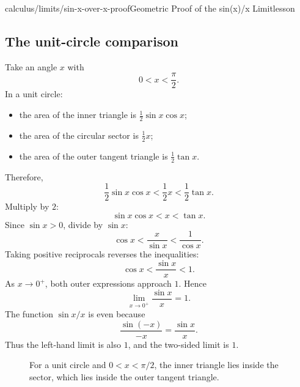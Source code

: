 \documentclass[11pt,openany]{book}
\theoremstyle{bgplain}
\begin{document}
\begin{webpage}{calculus/limits/sin-x-over-x-proof}{Geometric Proof of the sin(x)/x Limit}{lesson}
\subsection{The unit-circle comparison}

Take an angle \(x\) with
\[
  0<x<\frac{\pi}{2}.
\]
In a unit circle:

\begin{itemize}
  \item the area of the inner triangle is \(\frac12\sin x\cos x\);
  \item the area of the circular sector is \(\frac12x\);
  \item the area of the outer tangent triangle is \(\frac12\tan x\).
\end{itemize}

Therefore,
\[
  \frac12\sin x\cos x
  <\frac12x
  <\frac12\tan x.
\]
Multiply by \(2\):
\[
  \sin x\cos x<x<\tan x.
\]
Since \(\sin x>0\), divide by \(\sin x\):
\[
  \cos x<\frac{x}{\sin x}<\frac1{\cos x}.
\]
Taking positive reciprocals reverses the inequalities:
\[
  \cos x<\frac{\sin x}{x}<1.
\]
As \(x\to0^+\), both outer expressions approach \(1\). Hence
\[
  \lim_{x\to0^+}\frac{\sin x}{x}=1.
\]
The function \(\sin x/x\) is even because
\[
  \frac{\sin(-x)}{-x}=\frac{\sin x}{x}.
\]
Thus the left-hand limit is also \(1\), and the two-sided limit is \(1\).

\begin{figure}[htbp]
\centering
{}
\caption{For a unit circle and \(0<x<\pi/2\), the inner triangle lies inside the sector, which lies inside the outer tangent triangle.}
\label{fig:unit-circle-squeeze}
\end{figure}


\end{webpage}
\end{document}
